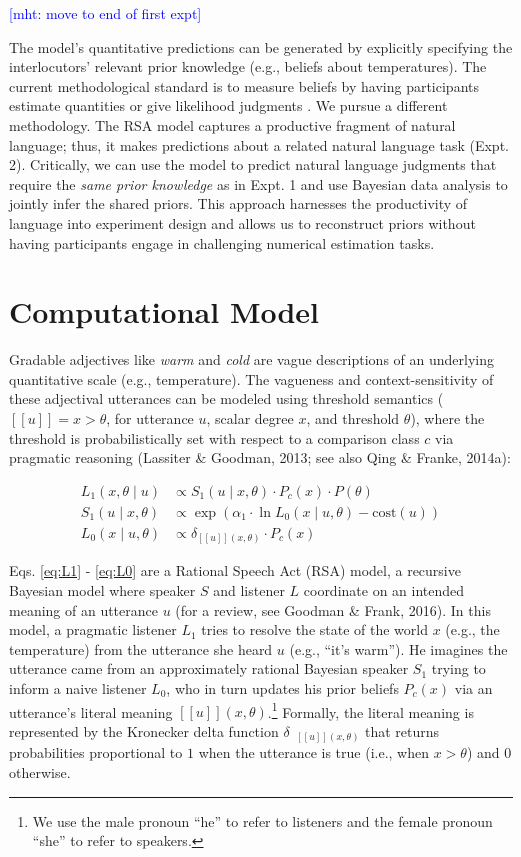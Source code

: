 \documentclass[doc]{apa6}
\begin{document}
\textcolor{Blue}{[mht: move to end of first expt]}

The model's quantitative predictions can be generated by explicitly
specifying the interlocutors' relevant prior knowledge (e.g., beliefs
about temperatures). The current methodological standard is to measure
beliefs by having participants estimate quantities or give likelihood
judgments \cite{Franke2016}. We pursue a different methodology. The
RSA model captures a productive fragment of natural language; thus, it
makes predictions about a related natural language task (Expt. 2).
Critically, we can use the model to predict natural language judgments
that require the \emph{same prior knowledge} as in Expt. 1 and use
Bayesian data analysis to jointly infer the shared priors. This approach
harnesses the productivity of language into experiment design and allows
us to reconstruct priors without having participants engage in
challenging numerical estimation tasks.

\section{Computational Model}

Gradable adjectives like \emph{warm} and \emph{cold} are vague
descriptions of an underlying quantitative scale (e.g., temperature).
The vagueness and context-sensitivity of these adjectival utterances can
be modeled using threshold semantics (\([\![u]\!] = x > \theta\), for
utterance \(u\), scalar degree \(x\), and threshold \(\theta\)), where
the threshold is probabilistically set with respect to a comparison
class \(c\) via pragmatic reasoning (Lassiter \& Goodman, 2013; see also
Qing \& Franke, 2014a):

\begin{align}
L_{1}(x, \theta \mid u) &\propto S_{1}(u \mid x, \theta) \cdot P_{c}(x) \cdot P(\theta) \label{eq:L1} \\
S_{1}(u \mid x, \theta) &\propto \exp{(\alpha_1 \cdot \ln {L_{0}(x \mid u, \theta)} - \text{cost}(u))} \label{eq:S1}\\
L_{0}(x \mid u, \theta) &\propto {\delta_{[\![u]\!](x, \theta)} \cdot P_{c}(x)} \label{eq:L0}
\end{align}

Eqs. \ref{eq:L1} - \ref{eq:L0} are a Rational Speech Act (RSA) model, a
recursive Bayesian model where speaker \(S\) and listener \(L\)
coordinate on an intended meaning of an utterance \(u\) (for a review,
see Goodman \& Frank, 2016). In this model, a pragmatic listener \(L_1\)
tries to resolve the state of the world \(x\) (e.g., the temperature)
from the utterance she heard \(u\) (e.g., ``it's warm''). He
imagines the utterance came from an approximately rational Bayesian
speaker \(S_1\) trying to inform a naive listener \(L_0\), who in turn
updates his prior beliefs \(P_c(x)\) via an utterance's literal meaning
\([\![u]\!](x, \theta)\).\footnote{We use the male pronoun ``he''
  to refer to listeners and the female pronoun ``she'' to refer to
  speakers.} Formally, the literal meaning is represented by the
Kronecker delta function \(\delta_{\mbox{ $[\![ u ]\!]$}(x, \theta)}\)
that returns probabilities proportional to \(1\) when the utterance is
true (i.e., when \(x > \theta\)) and \(0\) otherwise.
\end{document}
